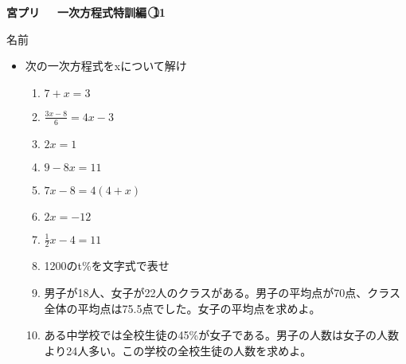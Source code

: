 \documentclass[a4paper,fleqn,papersize,15pt]{jsarticle}
\begin{document}
\clearpage
 \begin{center}
   \LARGE\textbf{宮プリ　~一次方程式特訓編~\textcircled{\scriptsize 11}}
     \begin{flushright}
       名前\underline{\hspace{8zw}}
     \end{flushright}
 \end{center}

 \begin{itemize}
   \item 次の一次方程式をxについて解け
   \begin{enumerate}
\item $7+x=3$ \begin{flushright}\framebox[8em]{\rule{0pt}{6ex}}\end{flushright} %
\item $\frac{3x-8}{6} =4x-3$ \begin{flushright}\framebox[8em]{\rule{0pt}{6ex}}\end{flushright} %
\item $2x=1$ \begin{flushright}\framebox[8em]{\rule{0pt}{6ex}}\end{flushright} %
\item $9-8x=11$ \begin{flushright}\framebox[8em]{\rule{0pt}{6ex}}\end{flushright} %
\item $7x-8=4(4+x)$ \begin{flushright}\framebox[8em]{\rule{0pt}{6ex}}\end{flushright} %
\item $2x=-12$ \begin{flushright}\framebox[8em]{\rule{0pt}{6ex}}\end{flushright} %
\item $\frac{1}{2} x-4=11$ \begin{flushright}\framebox[8em]{\rule{0pt}{6ex}}\end{flushright} %
\item 1200のt\%を文字式で表せ \vfill \begin{flushright}\framebox[8em]{\rule{0pt}{6ex}}\end{flushright} %
\item 男子が18人、女子が22人のクラスがある。男子の平均点が70点、クラス全体の平均点は75.5点でした。女子の平均点を求めよ。 \vfill \begin{flushright}\framebox[8em]{\rule{0pt}{6ex}}\end{flushright} %
\item ある中学校では全校生徒の45\%が女子である。男子の人数は女子の人数より24人多い。この学校の全校生徒の人数を求めよ。 \vfill \begin{flushright}\framebox[8em]{\rule{0pt}{6ex}}\end{flushright} %
\end{enumerate}
    \vfill
\end{itemize}
\end{document}
